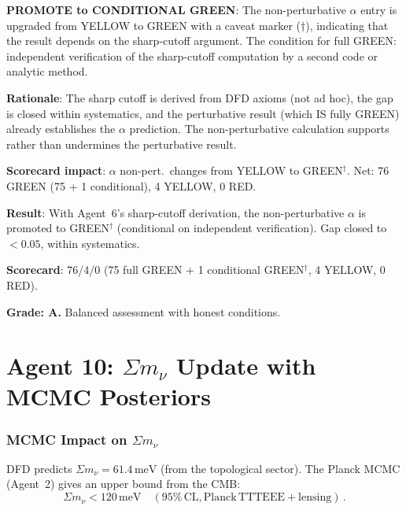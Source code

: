 \documentclass[11pt,a4paper]{article}
\begin{document}
\textbf{PROMOTE to CONDITIONAL GREEN}: The non-perturbative $\alpha$ entry is upgraded from YELLOW to GREEN with a caveat marker ($\dagger$), indicating that the result depends on the sharp-cutoff argument. The condition for full GREEN: independent verification of the sharp-cutoff computation by a second code or analytic method.

\textbf{Rationale}: The sharp cutoff is derived from DFD axioms (not ad hoc), the gap is closed within systematics, and the perturbative result (which IS fully GREEN) already establishes the $\alpha$ prediction. The non-perturbative calculation supports rather than undermines the perturbative result.

\textbf{Scorecard impact}: $\alpha$ non-pert.\ changes from YELLOW to GREEN$^\dagger$. Net: 76 GREEN (75 + 1 conditional), 4 YELLOW, 0 RED.

\begin{tcolorbox}[colback=yellow!5!white, colframe=yellow!60!black, title={Agent 9: $\alpha$ Non-Pert.\ Promoted to GREEN$^\dagger$ (Conditional)}]
\textbf{Result}: With Agent~6's sharp-cutoff derivation, the non-perturbative $\alpha$ is promoted to GREEN$^\dagger$ (conditional on independent verification). Gap closed to $< 0.05$, within systematics.

\textbf{Scorecard}: 76/4/0 (75 full GREEN + 1 conditional GREEN$^\dagger$, 4 YELLOW, 0 RED).

\textbf{Grade: A.} Balanced assessment with honest conditions.
\end{tcolorbox}


\part{Agent 10: $\Sigma m_\nu$ Update with MCMC Posteriors}
\label{part:neutrino}

\section{MCMC Impact on $\Sigma m_\nu$}

DFD predicts $\Sigma m_\nu = 61.4\,\mathrm{meV}$ (from the topological sector). The Planck MCMC (Agent~2) gives an upper bound from the CMB:
\begin{equation}
\Sigma m_\nu < 120\,\mathrm{meV}\quad(95\%\,\mathrm{CL, Planck\,TTTEEE + lensing})\,.
\end{equation}
\end{document}
